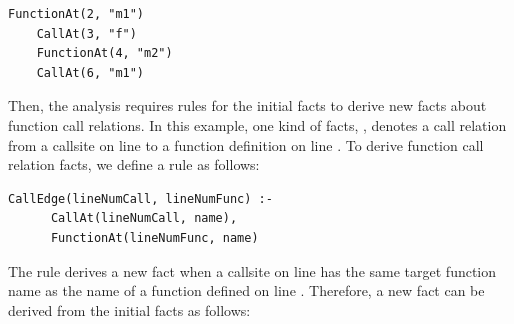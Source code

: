 
\begin{lstlisting}[style=mrule]
    FunctionAt(2, "m1")
    CallAt(3, "f")
    FunctionAt(4, "m2")
    CallAt(6, "m1")
\end{lstlisting}

Then, the analysis requires rules for the initial facts to derive new facts
about function call relations. In this example, one kind of facts, , denotes a call relation from a callsite on line 
to a function definition on line . To derive function call relation facts,
we define a rule as follows: 


\begin{lstlisting}[style=mrule]
    CallEdge(lineNumCall, lineNumFunc) :-
      CallAt(lineNumCall, name),
      FunctionAt(lineNumFunc, name)
\end{lstlisting}


\noindent
The rule derives a new fact  when a callsite on line
 has the same target function name as the name of a function defined
on line . Therefore, a new fact can be derived from the initial facts
as follows: 

